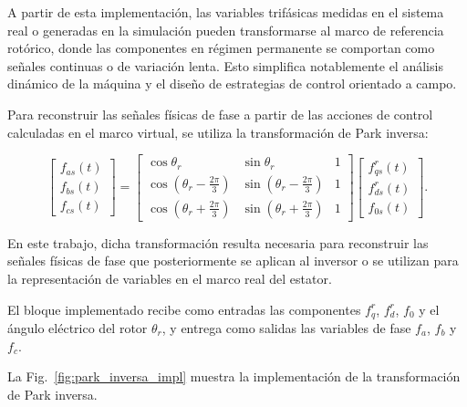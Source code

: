 \documentclass[10pt,a4paper]{article}
\begin{document}
A partir de esta implementación, las variables trifásicas medidas en el sistema real o generadas en la simulación pueden transformarse al marco de referencia rotórico, donde las componentes en régimen permanente se comportan como señales continuas o de variación lenta. Esto simplifica notablemente el análisis dinámico de la máquina y el diseño de estrategias de control orientado a campo.

Para reconstruir las señales físicas de fase a partir de las acciones de control calculadas en el marco virtual, se utiliza la transformación de Park inversa:

\begin{equation*}
	\begin{bmatrix}
		f_{as}(t)\\
		f_{bs}(t)\\
		f_{cs}(t)
	\end{bmatrix}
	=
	\begin{bmatrix}
		\cos\theta_r & \sin\theta_r & 1\\
		\cos\left(\theta_r-\frac{2\pi}{3}\right) & \sin\left(\theta_r-\frac{2\pi}{3}\right) & 1\\
		\cos\left(\theta_r+\frac{2\pi}{3}\right) & \sin\left(\theta_r+\frac{2\pi}{3}\right) & 1
	\end{bmatrix}
	\begin{bmatrix}
		f_{qs}^{r}(t)\\
		f_{ds}^{r}(t)\\
		f_{0s}(t)
	\end{bmatrix}.
\end{equation*}


En este trabajo, dicha transformación resulta necesaria para reconstruir las señales físicas de fase que posteriormente se aplican al inversor o se utilizan para la representación de variables en el marco real del estator.

El bloque implementado recibe como entradas las componentes \(f_q^r\), \(f_d^r\), \(f_0\) y el ángulo eléctrico del rotor \(\theta_r\), y entrega como salidas las variables de fase \(f_a\), \(f_b\) y \(f_c\).

La Fig.~\ref{fig:park_inversa_impl} muestra la implementación de la transformación de Park inversa.
\end{document}
